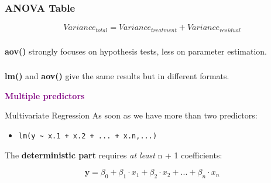 \documentclass{beamer}
\begin{document}
\begin{frame}
  \frametitle{ANOVA Table}

  
  \vspace{1cm}
  \begin{equation*}
  Variance_{total} = Variance_{treatment} + Variance_{residual}
  \end{equation*}
\end{frame}

\begin{frame}
  \frametitle{}
  \textbf{aov()} strongly focuses on hypothesis tests, less on parameter estimation.
\end{frame}

\begin{frame}
  \frametitle{}
  \textbf{lm()} and \textbf{aov()} give the same results but in different formats.
\end{frame}

\begin{frame}{}
  \begin{center}
    \huge\textbf{\textcolor{purple}{Multiple predictors}}
  \end{center}
\end{frame}

\begin{frame}{Multivariate Regression}
  As soon as we have more than two predictors:
  
  \begin{itemize}
      \item \texttt{lm(y \textasciitilde{} x.1 + x.2 + ... + x.n,...)}
  \end{itemize}
  
  The \textbf{deterministic part} requires \textit{at least} n + 1 coefficients:
  
  \begin{equation*}
    \mathbf{y} = \beta_0 + \beta_1 \cdot x_1 + \beta_2 \cdot x_2 + ... + \beta_n \cdot x_n 
  \end{equation*}
\end{frame}
\end{document}
